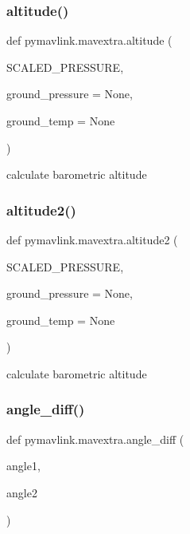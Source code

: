 \subsubsection{\texorpdfstring{altitude()}{altitude()}}
{\footnotesize\ttfamily def pymavlink.\+mavextra.\+altitude (\begin{DoxyParamCaption}\item[{}]{S\+C\+A\+L\+E\+D\+\_\+\+P\+R\+E\+S\+S\+U\+RE,  }\item[{}]{ground\+\_\+pressure = {\ttfamily None},  }\item[{}]{ground\+\_\+temp = {\ttfamily None} }\end{DoxyParamCaption})}

\begin{DoxyVerb}calculate barometric altitude\end{DoxyVerb}
 \mbox{\label{namespacepymavlink_1_1mavextra_af5dcda30d85d910c246199de4189750f}} 
\subsubsection{\texorpdfstring{altitude2()}{altitude2()}}
{\footnotesize\ttfamily def pymavlink.\+mavextra.\+altitude2 (\begin{DoxyParamCaption}\item[{}]{S\+C\+A\+L\+E\+D\+\_\+\+P\+R\+E\+S\+S\+U\+RE,  }\item[{}]{ground\+\_\+pressure = {\ttfamily None},  }\item[{}]{ground\+\_\+temp = {\ttfamily None} }\end{DoxyParamCaption})}

\begin{DoxyVerb}calculate barometric altitude\end{DoxyVerb}
 \mbox{\label{namespacepymavlink_1_1mavextra_a4c518cade632dd29062b09b919c4f9e1}} 
\subsubsection{\texorpdfstring{angle\+\_\+diff()}{angle\_diff()}}
{\footnotesize\ttfamily def pymavlink.\+mavextra.\+angle\+\_\+diff (\begin{DoxyParamCaption}\item[{}]{angle1,  }\item[{}]{angle2 }\end{DoxyParamCaption})}

